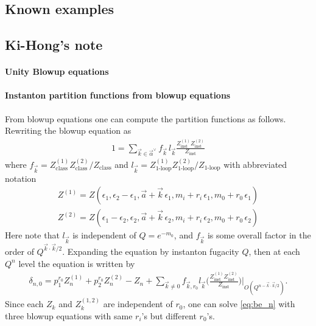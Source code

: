 \documentclass[letterpaper, 11pt]{article}
\begin{document}
{%






\subsection{Known examples}



\subsection{Ki-Hong's note}
\paragraph{Unity Blowup equations}

\paragraph{Instanton partition functions from blowup equations}
From blowup equations one can compute the partition functions as follows. Rewriting the blowup equation as
\begin{align}
1=\sum_{\vec{k}\in\vec{\alpha}^{\lor}}f_{\vec{k}}\,l_{\vec{k}}\frac{Z^{(1)}_{\textrm{inst}}Z^{(2)}_{\textrm{inst}}}{Z_{\textrm{inst}}}
\end{align}
where $f_{\vec{k}}=Z^{(1)}_{\textrm{class}}Z^{(2)}_{\textrm{class}}/Z_{\textrm{class}}$ and $l_{\vec{k}}=Z^{(1)}_{\textrm{1-loop}}Z^{(2)}_{\textrm{1-loop}}/Z_{\textrm{1-loop}}$ with abbreviated notation 
\begin{align}
Z^{(1)}=Z(\epsilon_1,\epsilon_2-\epsilon_1,\vec{a}+\vec{k}\,\epsilon_1,m_i+r_i\,\epsilon_1,m_0+r_0\,\epsilon_1)\nonumber\\
Z^{(2)}=Z(\epsilon_1-\epsilon_2,\epsilon_2,\vec{a}+\vec{k}\,\epsilon_2,m_i+r_i\,\epsilon_2,m_0+r_0\,\epsilon_2)
\end{align} 
Here note that $l_{\vec{k}}$ is independent of $Q=e^{-m_0}$, and $f_{\vec{k}}$ is some overall factor in the order of $Q^{\vec{k}\cdot\vec{k}/2}$. Expanding the equation by instanton fugacity $Q$, then at each $Q^{n}$ level the equation is written by 
\begin{align}
\delta_{n,0}=p_1^{r_0}Z^{(1)}_{n}+p_2^{r_0}Z^{(2)}_{n}-Z_{n}+\sum_{\vec{k}\neq 0}f_{\vec{k},r_0}l_{\vec{k}}\Bigg(\frac{Z^{(1)}_{\textrm{inst}}Z^{(2)}_{\textrm{inst}}}{Z_{\textrm{inst}}}\Bigg)\Bigg|_{O(Q^{n-\vec{k}\cdot\vec{k}/2})}.
\label{eq:be_n}
\end{align}
Since each $Z_{k}$ and $Z^{(1,2)}_{k}$ are independent of $r_0$, one can solve \eqref{eq:be_n} with three blowup equations with same $r_i$'s but different $r_0$'s. 

}
\end{document}
